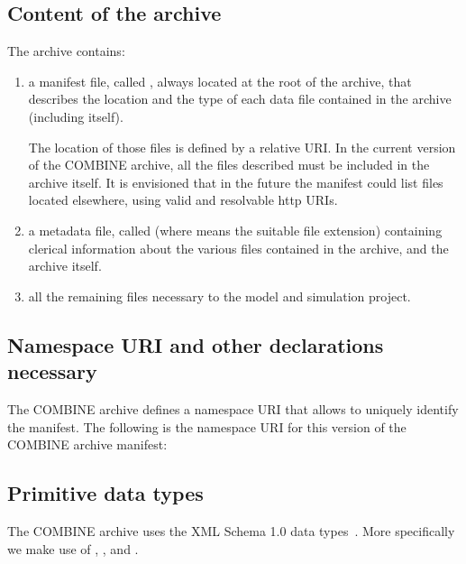 \subsection{Content of the archive}

The archive contains: 

\begin{enumerate}
	\item {
	
     a manifest file, called , always located at the 
     root of the archive, that describes the location and the type of each 
     data file contained in the archive (including itself). 
     
     The location of those files is defined by a relative URI. In the current 
     version of the COMBINE archive, all the files described must be included 
     in the archive itself. It is envisioned that in the future the manifest 
     could list files located elsewhere, using valid and resolvable http 
     URIs. 

	}
	\item {
     a metadata file, called  (where \token{*} means the 
     suitable file extension) containing clerical information about the 
     various files contained in the archive, and the archive itself. 
	}
	\item {all the remaining files necessary to the model and simulation project. }

\end{enumerate}

\subsection{Namespace URI and other declarations necessary}
\label{xml-namespace}

The COMBINE archive defines a namespace URI that allows to uniquely 
identify the manifest. The following is the namespace URI for this 
version of the COMBINE archive manifest: 


\begin{center}
\end{center}

\subsection{Primitive data types}
\label{primtypes}

The COMBINE archive uses the XML Schema 1.0 data types~\citep{biron:2000}.
More specifically we make use of , ,
and .


